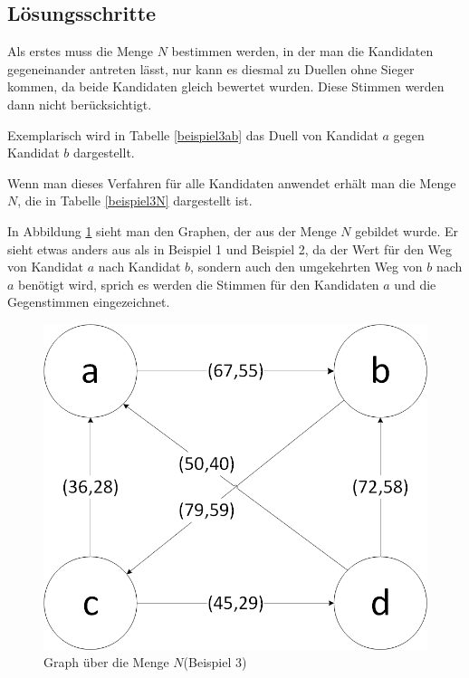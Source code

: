 \subsection{Lösungsschritte} 
\label{sec:loesungen3}
Als erstes muss die Menge $N$ bestimmen werden, in der man die Kandidaten gegeneinander antreten lässt, nur kann es diesmal zu Duellen ohne Sieger kommen, da beide Kandidaten gleich bewertet wurden. Diese Stimmen werden dann nicht berücksichtigt. 

Exemplarisch wird in Tabelle \ref{beispiel3ab} das Duell von Kandidat $a$ gegen Kandidat $b$ dargestellt. 




Wenn man dieses Verfahren für alle Kandidaten anwendet erhält man die Menge $N$, die in Tabelle \ref{beispiel3N} dargestellt ist.



In Abbildung \ref{fig:graph3} sieht man den Graphen, der aus der Menge $N$ gebildet wurde. Er sieht etwas anders aus als in Beispiel 1 und Beispiel 2, da der Wert für den Weg von Kandidat $a$ nach Kandidat $b$, sondern auch den umgekehrten Weg von $b$ nach $a$ benötigt wird, sprich es werden die Stimmen für den Kandidaten $a$ und die Gegenstimmen eingezeichnet. 

\begin{figure}[!h]
\centering
\includegraphics[scale=0.5]{Bilder/Beispiel3_Graph.png}
\caption{Graph über die Menge $N$(Beispiel 3)}
\label{fig:graph3}
\end{figure}

